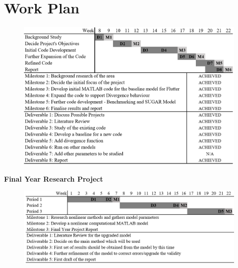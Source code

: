 \documentclass[11pt]{article}
\begin{document}
\section{Work Plan}
\begin{figure}[H]
    \centering
    \includegraphics[width = .9\textwidth]{figures/dandm.png}
\end{figure}

\textbf{Final Year Research Project}
\begin{figure}[H]
    \centering
    \includegraphics[width = .9\textwidth]{figures/fyp.png}
\end{figure}

\cleardoublepage

\newpage

\cleardoublepage
{} 
\end{document}
